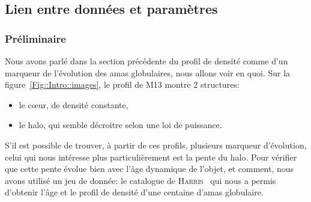 		\subsection[Lien]{Lien entre données et paramètres\label{amas}}

			\subsubsection{Préliminaire}
				Nous avons parlé dans la section précédente du profil de densité
				comme d'un marqueur de l'évolution des amas globulaires, nous allons
				voir en quoi. Sur la figure~\ref{Fig::Intro::images}, le profil de
				M13 montre 2 structures:
				\begin{itemize}
						\item le cœur, de densité constante,
						\item le halo, qui semble décroitre selon une loi de
							puissance.
				\end{itemize}
				S'il est possible de trouver, à partir de ces profils, plusieurs
				marqueur d'évolution, celui qui nous intéresse plus particulièrement
				est la pente du halo. Pour vérifier que cette pente évolue bien avec
				l'âge dynamique de l'objet, et comment, nous avons utilisé un jeu
				de donnée: le catalogue de \textsc{Harris}~\cite{Harris} qui nous a
				permis d'obtenir l'âge et le profil de densité d'une centaine d'amas
				globulaire.
				
